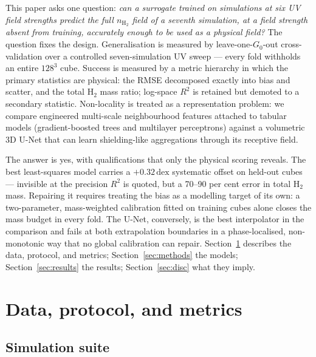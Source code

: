 \documentclass[fleqn,usenatbib]{rasti}
\newcommand{\nHH}{n_{\mathrm{H_2}}}
\newcommand{\Gzero}{G_0}
\newcommand{\dex}{\,\text{dex}}
\newcommand{\Rsq}{R^2}
\begin{document}
This paper asks one question: \emph{can a surrogate trained on
simulations at six UV field strengths predict the full \(\nHH\) field of a
seventh simulation, at a field strength absent from training, accurately
enough to be used as a physical field?} The question fixes the design.
Generalisation is measured by leave-one-\(\Gzero\)-out cross-validation
over a controlled seven-simulation UV sweep --- every fold withholds an
entire \(128^3\) cube. Success is measured by a metric hierarchy in which
the primary statistics are physical: the RMSE decomposed exactly into
bias and scatter, and the total H\(_2\) mass ratio; log-space \(\Rsq\) is
retained but demoted to a secondary statistic. Non-locality is treated
as a representation problem: we compare engineered multi-scale
neighbourhood features attached to tabular models (gradient-boosted
trees and multilayer perceptrons) against a volumetric 3D U-Net
\citep{Ronneberger2015,Cicek2016} that can learn shielding-like
aggregations through its receptive field.

The answer is yes, with qualifications that only the physical scoring
reveals. The best least-squares model carries a \(+0.32\dex\) systematic
offset on held-out cubes --- invisible at the precision \(\Rsq\) is
quoted, but a 70--90 per cent error in total H\(_2\) mass. Repairing it
requires treating the bias as a modelling target of its own: a
two-parameter, mass-weighted calibration fitted on training cubes alone
closes the mass budget in every fold. The U-Net, conversely, is the
best interpolator in the comparison and fails at both extrapolation
boundaries in a phase-localised, non-monotonic way that no global
calibration can repair. Section~\ref{sec:setup} describes the data,
protocol, and metrics; Section~\ref{sec:methods} the models;
Section~\ref{sec:results} the results; Section~\ref{sec:disc} what they
imply.

\section{Data, protocol, and metrics}
\label{sec:setup}

\subsection{Simulation suite}
\label{sec:data}
\end{document}
